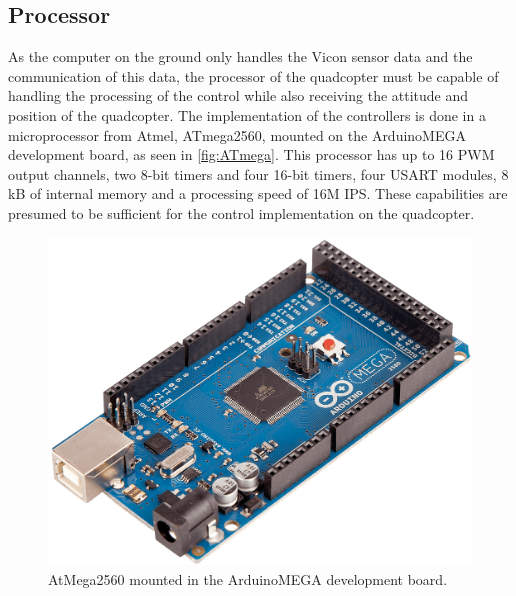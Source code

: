 \subsection{Processor}
As the computer on the ground only handles the Vicon sensor data and the communication of this data, the processor of the quadcopter must be capable of handling the processing of the control while also receiving the attitude and position of the quadcopter.
The implementation of the controllers is done in a microprocessor from Atmel, ATmega2560, mounted on the ArduinoMEGA development board, as seen in \autoref{fig:ATmega}. This processor has up to 16 PWM output channels, two 8-bit timers and four 16-bit timers, four USART modules, 8 kB of internal memory and a processing speed of 16M IPS. These capabilities are presumed to be sufficient for the control implementation on the quadcopter.\cite{ATmega2560}

\begin{figure}[H]
	\centering
	\includegraphics[scale=0.12]{figures/ARDUINO_MEGA}
	\caption{AtMega2560 mounted in the ArduinoMEGA development board.\cite{ArduinoMegaImage}}
	\label{fig:ATmega}
\end{figure}
%
